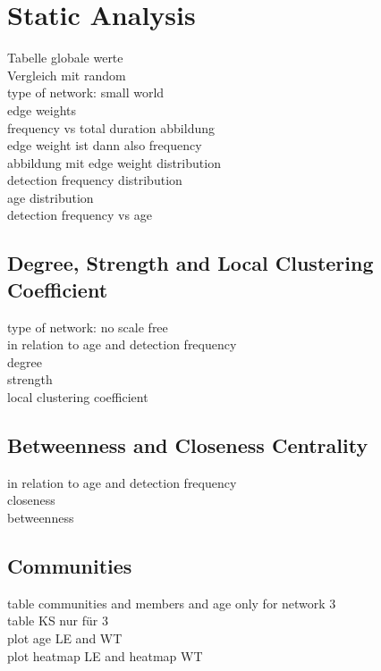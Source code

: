 \section{Static Analysis}

Tabelle globale werte\\
Vergleich mit random\\
type of network: small world\\

edge weights\\
frequency vs total duration abbildung\\
edge weight ist dann also frequency\\
abbildung mit edge weight distribution\\

detection frequency distribution\\
age distribution\\
detection frequency vs age\\


\subsection{Degree, Strength and Local Clustering Coefficient}
type of network: no scale free\\
in relation to age and detection frequency\\
degree\\
strength\\
local clustering coefficient\\

\subsection{Betweenness and Closeness Centrality}
in relation to age and detection frequency\\
closeness\\
betweenness\\

\subsection{Communities}
table communities and members and age only for network 3\\
table KS nur für 3\\
plot age LE and WT\\
plot heatmap LE and heatmap WT\\